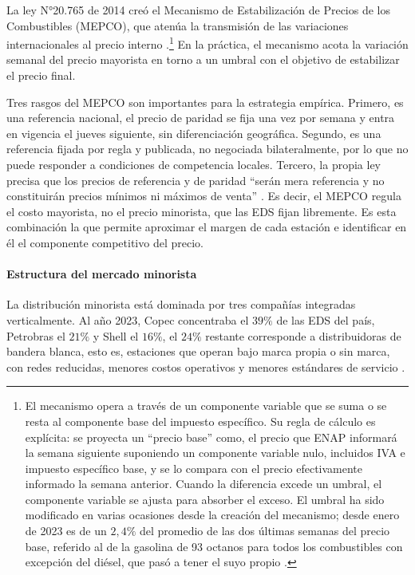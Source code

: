 La ley N°20.765 de 2014 creó el Mecanismo de Estabilización de Precios de los Combustibles (MEPCO), que atenúa la transmisión de las variaciones internacionales al precio interno \parencite{LEY20765}.\footnote{El mecanismo opera a través de un componente variable que se suma o se resta al componente base del impuesto específico. Su regla de cálculo es explícita: se proyecta un ``precio base'' como, el precio que ENAP informará la semana siguiente suponiendo un componente variable nulo, incluidos IVA e impuesto específico base, y se lo compara con el precio efectivamente informado la semana anterior. Cuando la diferencia excede un umbral, el componente variable se ajusta para absorber el exceso. El umbral ha sido modificado en varias ocasiones desde la creación del mecanismo; desde enero de 2023 es de un $2{,}4\%$ del promedio de las dos últimas semanas del precio base, referido al de la gasolina de 93 octanos para todos los combustibles con excepción del diésel, que pasó a tener el suyo propio \parencite{LEY21537}.}  En la práctica, el mecanismo acota la variación semanal del precio mayorista en torno a un umbral con el objetivo de estabilizar el precio final.

Tres rasgos del MEPCO son importantes para la estrategia empírica. Primero, es una referencia nacional, el precio de paridad se fija una vez por semana y entra en vigencia el jueves siguiente, sin diferenciación geográfica. Segundo, es una referencia fijada por regla y publicada, no negociada bilateralmente, por lo que no puede responder a condiciones de competencia locales. Tercero, la propia ley precisa que los precios de referencia y de paridad ``serán mera referencia y no constituirán precios mínimos ni máximos de venta'' \parencite{LEY20765}. Es decir, el MEPCO regula el costo mayorista, no el precio minorista, que las EDS fijan libremente. Es esta combinación la que permite aproximar el margen de cada estación e identificar en él el componente competitivo del precio.

\paragraph{Estructura del mercado minorista} La distribución minorista está dominada por tres compañías integradas verticalmente. Al año 2023, Copec concentraba el $39\%$ de las EDS del país, Petrobras el $21\%$ y Shell el $16\%$, el $24\%$ restante corresponde a distribuidoras de bandera blanca, esto es, estaciones que operan bajo marca propia o sin marca, con redes reducidas, menores costos operativos y menores estándares de servicio \parencite{FNE2025informe}.

